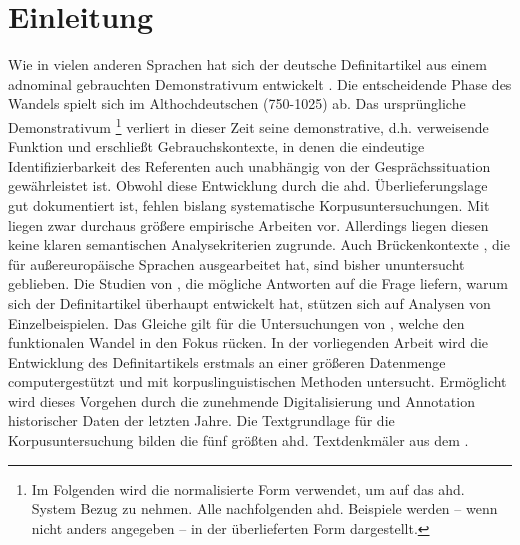 \chapter{Einleitung}

Wie in vielen anderen Sprachen hat sich der deutsche Definitartikel aus einem adnominal gebrauchten Demonstrativum entwickelt  \parencite{Oubouzar1992,Szczepaniak2011a}. Die entscheidende Phase des Wandels spielt sich im Althochdeutschen (750-1025) ab. Das ursprüngliche Demonstrativum \footnote{Im Folgenden wird die normalisierte Form  verwendet, um auf das ahd. System Bezug zu nehmen. Alle nachfolgenden ahd. Beispiele werden -- wenn nicht anders angegeben -- in der überlieferten Form dargestellt.} verliert in dieser Zeit seine demonstrative, d.h. verweisende Funktion und erschließt Gebrauchskontexte, in denen die eindeutige Identifizierbarkeit des Referenten auch unabhängig von der Gesprächssituation gewährleistet ist. Obwohl diese Entwicklung durch die ahd. Überlieferungslage gut dokumentiert ist, fehlen bislang systematische Korpusuntersuchungen. Mit \textcite{Hodler1954,Oubouzar1989,Oubouzar1992,Oubouzar1997a} liegen zwar durchaus größere empirische Arbeiten vor. Allerdings liegen diesen keine klaren semantischen Analysekriterien zugrunde. Auch Brückenkontexte \parencite{Heine2002a}, die \textcite{Himmelmann1997} für außereuropäische Sprachen ausgearbeitet hat, sind bisher ununtersucht geblieben. Die Studien von \textcite{Abraham1997,Philippi1997,Leiss2000}, die mögliche Antworten auf die Frage liefern, warum sich der Definitartikel überhaupt entwickelt hat, stützen sich auf Analysen von Einzelbeispielen. Das Gleiche gilt für die Untersuchungen von \textcite{Demske2001,Kraiss2012,Kraiss2014,Schlachter2015}, welche den funktionalen Wandel in den Fokus rücken.
In der vorliegenden Arbeit wird die Entwicklung des Definitartikels erstmals an einer größeren Datenmenge computergestützt und mit korpuslinguistischen Methoden untersucht. Ermöglicht wird dieses Vorgehen durch die zunehmende Digitalisierung und Annotation historischer Daten der letzten Jahre. Die Textgrundlage für die Korpusuntersuchung bilden die fünf größten ahd. Textdenkmäler aus dem   \parencite{Donhauser2015}.

